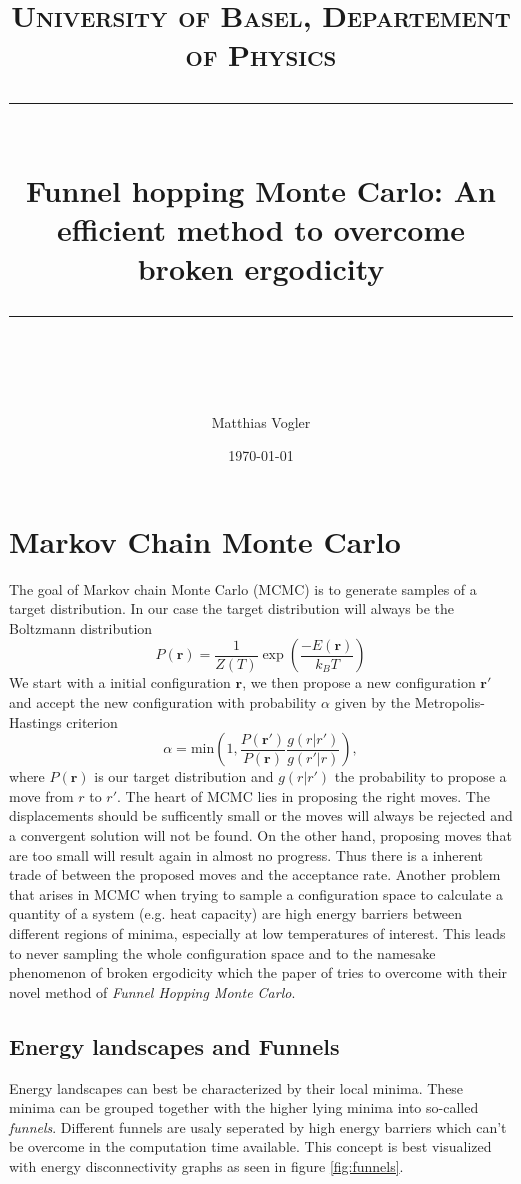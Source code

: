 \documentclass[11pt]{scrartcl} %
\title{	
	\normalfont\normalsize
	\textsc{University of Basel, Departement of Physics}\\ %
	\vspace{25pt} %
	\rule{\linewidth}{0.5pt}\\ %
	\vspace{20pt} %
	{\huge Funnel hopping Monte Carlo: An efficient
method to overcome broken ergodicity \cite{Finkler2020}}\\ %
	\vspace{12pt} %
	\rule{\linewidth}{2pt}\\ %
	\vspace{12pt} %
}
\author{\LARGE Matthias Vogler} %
\date{\normalsize\today} %
\begin{document}
\maketitle %


\section{Markov Chain Monte Carlo}
The goal of Markov chain Monte Carlo (MCMC) is to generate samples of a target distribution. In our case the target distribution will always be the Boltzmann distribution
\begin{equation}
	P(\mathbf{r})=\frac{1}{Z(T)}\exp\left(\frac{-E(\mathbf{r})}{k_B T}\right)
\end{equation}
We start with a initial configuration $\mathbf{r}$, we then propose a new configuration $\mathbf{r}'$ and accept the new configuration with probability $\alpha$ given by the Metropolis-Hastings criterion \cite{Hastings1970}
\begin{equation}
	\alpha=\text{min}\left(1,\frac{P(\mathbf{r}')}{P(\mathbf{r})}\frac{g(r|r')}{g(r'|r)}\right),
	\label{metropolis}
\end{equation}
where $P(\mathbf{r})$ is our target distribution and $g(r|r')$ the probability to propose a move from $r$ to $r'$. The heart of MCMC lies in proposing the right moves. The displacements should be sufficently small or the moves will always be rejected and a convergent solution will not be found. On the other hand, proposing moves that are too small will result again in almost no progress. Thus there is a inherent trade of between the proposed moves and the acceptance rate. Another problem that arises in MCMC when trying to sample a configuration space to calculate a quantity of a system (e.g. heat capacity) are high energy barriers between different regions of minima, especially at low temperatures of interest. This leads to never sampling the whole configuration space and to the namesake phenomenon of broken ergodicity which the paper of \citeauthor{Finkler2020} tries to overcome with their novel method of \emph{Funnel Hopping Monte Carlo}.\\
\subsection{Energy landscapes and Funnels}
Energy landscapes can best be characterized by their local minima. These minima can be grouped together with the higher lying minima into so-called \emph{funnels}. Different funnels are usaly seperated by high energy barriers which can't be overcome in the computation time available. This concept is best visualized with energy disconnectivity graphs as seen in figure \ref{fig:funnels}.
\end{document}
